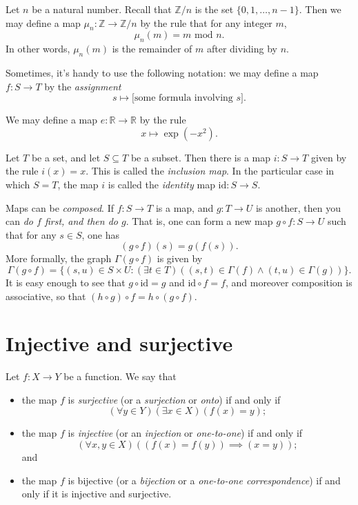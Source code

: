 \documentclass[11pt,dvipsnames]{book}
\def\Z{\mathbb{Z}}
\numberwithin{figure}{section} %
\numberwithin{table}{section} %
\begin{document}
\begin{example}
Let $n$ be a natural number.
Recall that $\Z/n$ is the set $\{0,1,\dots,n-1\}$.
Then we may define a map $\mu_n \colon \Z \to \Z/n$ by the rule that for any integer $m$,
\[
\mu_n(m) = m\mbox{ mod }n.\]
In other words, $\mu_n(m)$ is the remainder of $m$ after dividing by $n$.
\end{example}

Sometimes, it's handy to use the following notation:
we may define a map $ f \colon S \to T $ by the \emph{assignment}
\[
	s \mapsto \text{[some formula involving $s$].}
\]

\begin{example}
We may define a map $ e \colon \mathbb{R} \to \mathbb{R}$ by the rule
\[
x \mapsto \exp(-x^2).
\]
\end{example}

\begin{example}
Let $T$ be a set, and let $S \subseteq T$ be a subset.
Then there is a map $i \colon S \to T$ given by the rule $i(x)=x$.
This is called the \emph{inclusion map}.
In the particular case in which $S=T$, the map $i$ is called the \emph{identity} map $\mathrm{id} \colon S \to S$.
\end{example}

Maps can be \emph{composed}.
If $f\colon S \to T$ is a map, and $g\colon T \to U$ is another, then you can \emph{do $f$ first, and then do $g$}.
That is, one can form a new map $g\circ f\colon S \to U$ such that for any $s\in S$, one has
\[
	(g\circ f)(s)= g(f(s)) .
\]
More formally, the graph $\Gamma(g\circ f)$ is given by
\[
	\Gamma(g\circ f)=\{(s,u)\in S\times U : (\exists t\in T)((s,t)\in\Gamma(f)\wedge(t,u)\in\Gamma(g))\}.
\]
It is easy enough to see that $g\circ\mathrm{id}=g$ and $\mathrm{id}\circ f=f$, and moreover composition is associative, so that $(h\circ g)\circ f=h\circ(g\circ f)$.

\section{Injective and surjective}

\begin{definition}
Let $f \colon X\rightarrow Y$ be a function. We say that
\begin{itemize}
\item the map $f$ is \emph{surjective} (or a \emph{surjection} or \emph{onto}) if and only if
\[
(\forall y\in Y)(\exists x\in X)(f(x)=y);
\]

\item the map $f$ is \emph{injective} (or an \emph{injection} or \emph{one-to-one}) if and only if
\[
(\forall x,y\in X)((f(x)=f(y)) \implies (x=y));
\]
and

\item the map $f$ is bijective (or a \emph{bijection} or a \emph{one-to-one correspondence}) if and only if it is injective and surjective.
\end{itemize}
\end{definition}
\end{document}
